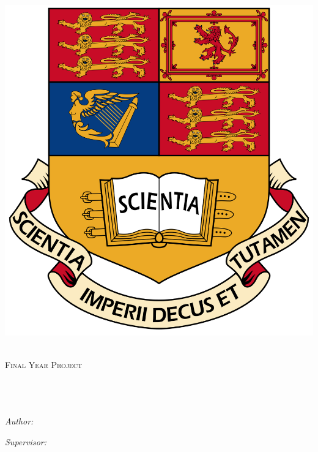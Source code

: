 \documentclass[11pt, a4paper, oneside]{Thesis} %
\begin{document}
\begin{titlepage}
\begin{center}

\includegraphics[scale=0.1]{Logo} %

\textsc{\LARGE \univname}\\[1cm] %
\textsc{\Large Final Year Project}\\[0.5cm] %

\HRule \\[0.4cm] %
{\huge \bfseries \ttitle}\\[0.4cm] %
\HRule \\[1.5cm] %
 
\begin{minipage}{0.4\textwidth}
\begin{flushleft} \large
\emph{Author:}\\
\href{mailto:marcin.baginski91@gmail.com}{\authornames} %
\end{flushleft}
\end{minipage}
\begin{minipage}{0.4\textwidth}
\begin{flushright} \large
\emph{Supervisor:} \\
\href{mailto:mike.brookes@imperial.ac.uk}{\supname} %
\end{flushright}
\end{minipage}\\[2cm]
 

\end{center}
\end{titlepage}
\end{document}
